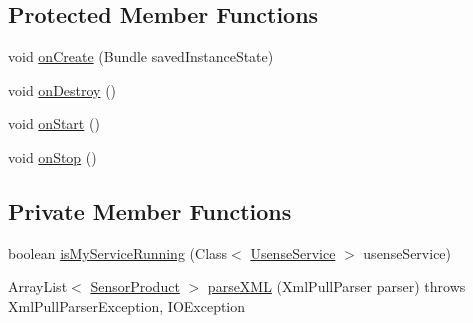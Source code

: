 \subsection*{Protected Member Functions}
\begin{DoxyCompactItemize}
\item 
void \hyperlink{classcs_1_1usense_1_1_usense_activity_adb84502149d9c19721a43fce52f1ed6c}{on\+Create} (Bundle saved\+Instance\+State)
\item 
void \hyperlink{classcs_1_1usense_1_1_usense_activity_a961bbbd053d9dd93f0d2be8aa33a85c7}{on\+Destroy} ()
\item 
void \hyperlink{classcs_1_1usense_1_1_usense_activity_a82341e86578c5e13427d73ab3ebac1d2}{on\+Start} ()
\item 
void \hyperlink{classcs_1_1usense_1_1_usense_activity_a6100693322a3f3ebc9b67072da076535}{on\+Stop} ()
\end{DoxyCompactItemize}
\subsection*{Private Member Functions}
\begin{DoxyCompactItemize}
\item 
boolean \hyperlink{classcs_1_1usense_1_1_usense_activity_a866b80769c6c850d6d84f5cb7931266a}{is\+My\+Service\+Running} (Class$<$ \hyperlink{classcs_1_1usense_1_1_usense_service}{Usense\+Service} $>$ usense\+Service)
\item 
Array\+List$<$ \hyperlink{classcs_1_1usense_1_1_sensor_product}{Sensor\+Product} $>$ \hyperlink{classcs_1_1usense_1_1_usense_activity_a169269ab9c9714296c7e6fd33a3d52af}{parse\+X\+M\+L} (Xml\+Pull\+Parser parser)  throws Xml\+Pull\+Parser\+Exception, I\+O\+Exception 
\end{DoxyCompactItemize}
